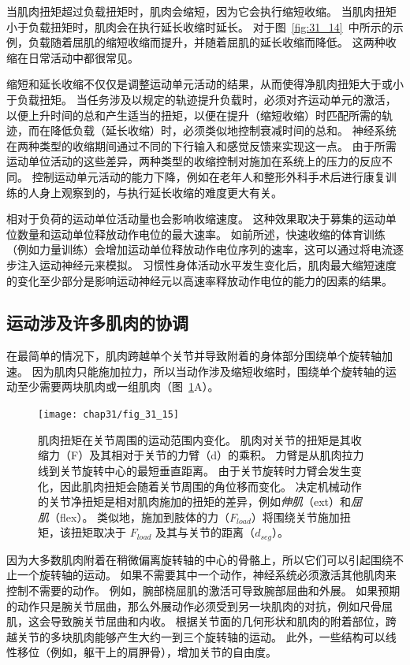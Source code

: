 当肌肉扭矩超过负载扭矩时，肌肉会缩短，因为它会执行缩短收缩。
当肌肉扭矩小于负载扭矩时，肌肉会在执行延长收缩时延长。
对于图~\ref{fig:31_14}~中所示的示例，负载随着屈肌的缩短收缩而提升，并随着屈肌的延长收缩而降低。
这两种收缩在日常活动中都很常见。


缩短和延长收缩不仅仅是调整运动单元活动的结果，从而使得净肌肉扭矩大于或小于负载扭矩。
当任务涉及以规定的轨迹提升负载时，必须对齐运动单元的激活，以便上升时间的总和产生适当的扭矩，以便在提升（缩短收缩）时匹配所需的轨迹，而在降低负载（延长收缩）时，必须类似地控制衰减时间的总和。
神经系统在两种类型的收缩期间通过不同的下行输入和感觉反馈来实现这一点。
由于所需运动单位活动的这些差异，两种类型的收缩控制对施加在系统上的压力的反应不同。
控制运动单元活动的能力下降，例如在老年人和整形外科手术后进行康复训练的人身上观察到的，与执行延长收缩的难度更大有关。


相对于负荷的运动单位活动量也会影响收缩速度。
这种效果取决于募集的运动单位数量和运动单位释放动作电位的最大速率。
如前所述，快速收缩的体育训练（例如力量训练）会增加运动单位释放动作电位序列的速率，这可以通过将电流逐步注入运动神经元来模拟。
习惯性身体活动水平发生变化后，肌肉最大缩短速度的变化至少部分是影响运动神经元以高速率释放动作电位的能力的因素的结果。



\subsection{运动涉及许多肌肉的协调}

在最简单的情况下，肌肉跨越单个关节并导致附着的身体部分围绕单个旋转轴加速。
因为肌肉只能施加拉力，所以当动作涉及缩短收缩时，围绕单个旋转轴的运动至少需要两块肌肉或一组肌肉（图~\ref{fig:31_15}A）。



\begin{figure}[htbp]
	\centering
	\texttt{[image: chap31/fig\_31\_15]}
	\caption{肌肉扭矩在关节周围的运动范围内变化。
	肌肉对关节的扭矩是其收缩力（F）及其相对于关节的力臂（d）的乘积。
	力臂是从肌肉拉力线到关节旋转中心的最短垂直距离。
	由于关节旋转时力臂会发生变化，因此肌肉扭矩会随着关节周围的角位移而变化。
	决定机械动作的关节净扭矩是相对肌肉施加的扭矩的差异，例如\textit{伸肌}（ext）和\textit{屈肌}（flex）。
	类似地，施加到肢体的力（$ F_{load} $）将围绕关节施加扭矩，该扭矩取决于 $ F_{load} $ 及其与关节的距离（$ d_{seg} $）。}
	\label{fig:31_15}
\end{figure}


因为大多数肌肉附着在稍微偏离旋转轴的中心的骨骼上，所以它们可以引起围绕不止一个旋转轴的运动。
如果不需要其中一个动作，神经系统必须激活其他肌肉来控制不需要的动作。
例如，腕部桡屈肌的激活可导致腕部屈曲和外展。
如果预期的动作只是腕关节屈曲，那么外展动作必须受到另一块肌肉的对抗，例如尺骨屈肌，这会导致腕关节屈曲和内收。
根据关节面的几何形状和肌肉的附着部位，跨越关节的多块肌肉能够产生大约一到三个旋转轴的运动。
此外，一些结构可以线性移位（例如，躯干上的肩胛骨），增加关节的自由度。


